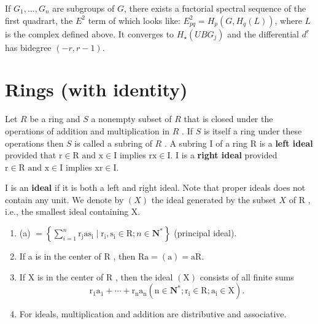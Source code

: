 \begin{prop}
If $G_1, \ldots, G_n$ are subgroups of $G$, there exists a fuctorial spectral sequence of the first quadrart, the $E^2$ term of which looks like: $E_{p q}^2=H_p\left(G, H_q(L)\right)$, where $L$ is the complex defined above. It converges to $H_{\star}\left(U B G_j\right)$ and the differential $d^r$ has bidegree $(-r, r-1)$.   
\end{prop}





\chapter{Rings (with identity)}

Let $R$ be a ring and $S$ a nonempty subset of $R$ that is closed under the operations of addition and multiplication in $R$ . If $S$ is itself a ring under these operations then $S$ is called a subring of $R$ . A subring I of a ring R is a \textbf{left ideal} provided that
$
\mathrm{r} \in \mathrm{R} \text { and } \mathrm{x} \in \mathrm{I}$ implies $  \mathrm{rx} \in \mathrm{I} 
$.
I is a \textbf{right ideal} provided
$
\mathrm{r} \in \mathrm{R} \text { and } \mathrm{x} \in \mathrm{I}$ implies $  \mathrm{xr} \in \mathrm{I}
$.

I is an \textbf{ideal} if it is both a left and right ideal. Note that proper ideals does not contain any unit. We denote by $(X)$ the ideal generated by the subset $X$ of R , i.e., the smallest ideal containing X.
\begin{theo}
    \begin{enumerate}
        \item (a) $=\left\{\sum_{i=1}^n \mathrm{r}_{\mathrm{j}} \mathrm{as}_{\mathrm{i}} \mid \mathrm{r}_{\mathrm{i}}, \mathrm{s}_{\mathrm{i}} \in \mathrm{R} ; n \in \mathbf{N}^*\right\}$ (principal ideal).
        \item If a is in the center of R , then $\mathrm{Ra}=(\mathrm{a})=\mathrm{aR}$.
        \item If X is in the center of R , then the ideal $(\mathrm{X})$ consists of all finite sums $$\mathrm{r}_1 \mathrm{a}_1+\cdots+\mathrm{r}_{\mathrm{n}} \mathrm{a}_{\mathrm{n}}\left(\mathrm{n} \in \mathbf{N}^* ; \mathrm{r}_{\mathrm{i}} \in \mathrm{R} ; \mathrm{a}_{\mathrm{i}} \in \mathrm{X}\right).$$
        \item For ideals, multiplication and addition are distributive and associative.
    \end{enumerate}
\end{theo}


